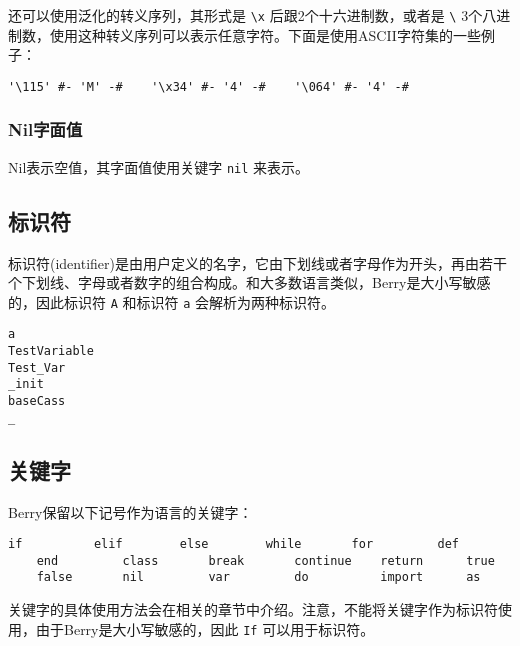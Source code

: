 还可以使用泛化的转义序列，其形式是 \texttt{\textbackslash x} 后跟2个十六进制数，或者是 \texttt{\textbackslash} 3个八进制数，使用这种转义序列可以表示任意字符。下面是使用ASCII字符集的一些例子：
\begin{lstlisting}[language=berry, numbers=none]
'\115' #- 'M' -#    '\x34' #- '4' -#    '\064' #- '4' -#
\end{lstlisting}

\subsubsection{Nil字面值}

Nil表示空值，其字面值使用关键字 \texttt{nil} 来表示。

\subsection{标识符} \label{section:identifier}

标识符(identifier)是由用户定义的名字，它由下划线或者字母作为开头，再由若干个下划线、字母或者数字的组合构成。和大多数语言类似，Berry是大小写敏感的，因此标识符 \texttt{A} 和标识符 \texttt{a} 会解析为两种标识符。
\begin{lstlisting}[language=berry, numbers=none]
a
TestVariable
Test_Var
_init
baseCass
_
\end{lstlisting}

\subsection{关键字}

Berry保留以下记号作为语言的关键字：
\begin{lstlisting}[language=berry, numbers=none]
    if          elif        else        while       for         def
    end         class       break       continue    return      true
    false       nil         var         do          import      as
\end{lstlisting}

关键字的具体使用方法会在相关的章节中介绍。注意，不能将关键字作为标识符使用，由于Berry是大小写敏感的，因此 \texttt{If} 可以用于标识符。
